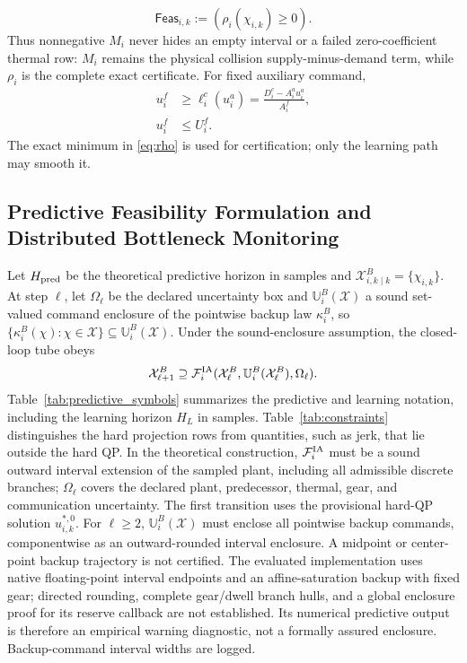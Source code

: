 \begin{equation}\label{eq:instantfeas}
\mathsf{Feas}_{i,k}:=(\rho_i(\chi_{i,k})\ge0).
\end{equation}
Thus nonnegative $M_i$ never hides an empty interval or a failed zero-coefficient thermal row: $M_i$ remains the physical collision supply-minus-demand term, while $\rho_i$ is the complete exact certificate. For fixed auxiliary command,
\begin{align}
u_i^f&\ge\ell_i^c(u_i^a)=\frac{D_i^c-A_i^au_i^a}{A_i^f},\label{eq:lower}\\
u_i^f&\le U_i^f.\label{eq:upper}
\end{align}
The exact minimum in \eqref{eq:rho} is used for certification; only the learning path may smooth it.

\subsection{Predictive Feasibility Formulation and Distributed Bottleneck Monitoring}
Let $H_{\rm pred}$ be the theoretical predictive horizon in samples and $\mathcal X^B_{i,k\mid k}=\{\chi_{i,k}\}$. At step $\ell$, let $\Omega_\ell$ be the declared uncertainty box and $\mathbb U_i^B(\mathcal X)$ a sound set-valued command enclosure of the pointwise backup law $\kappa_i^B$, so $\{\kappa_i^B(\chi):\chi\in\mathcal X\}\subseteq\mathbb U_i^B(\mathcal X)$. Under the sound-enclosure assumption, the closed-loop tube obeys
\begin{equation}\label{eq:tube}
\mathcal X^B_{\ell+1}\supseteq\mathcal F_i^{\rm IA}(\mathcal X^B_\ell,\mathbb U_i^B(\mathcal X^B_\ell),\Omega_\ell).
\end{equation}
Table~\ref{tab:predictive_symbols} summarizes the predictive and learning notation, including the learning horizon $H_L$ in samples. Table~\ref{tab:constraints} distinguishes the hard projection rows from quantities, such as jerk, that lie outside the hard QP.
In the theoretical construction, $\mathcal F_i^{\rm IA}$ must be a sound outward interval extension of the sampled plant, including all admissible discrete branches; $\Omega_\ell$ covers the declared plant, predecessor, thermal, gear, and communication uncertainty. The first transition uses the provisional hard-QP solution $u_{i,k}^{*,0}$. For $\ell\ge2$, $\mathbb U_i^B(\mathcal X)$ must enclose all pointwise backup commands, componentwise as an outward-rounded interval enclosure. A midpoint or center-point backup trajectory is not certified. The evaluated implementation uses native floating-point interval endpoints and an affine-saturation backup with fixed gear; directed rounding, complete gear/dwell branch hulls, and a global enclosure proof for its reserve callback are not established. Its numerical predictive output is therefore an empirical warning diagnostic, not a formally assured enclosure. Backup-command interval widths are logged.

